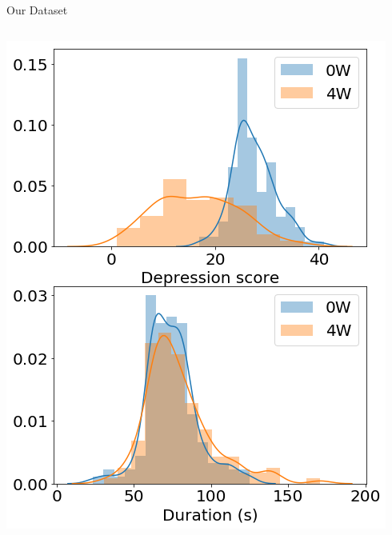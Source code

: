 \documentclass{beamer}
\begin{document}
\begin{frame}{Our Dataset}
\begin{columns}
			\includegraphics[width=\linewidth]{./Images/depscores_2.png}
	\end{columns}

\end{frame}

\end{document}
